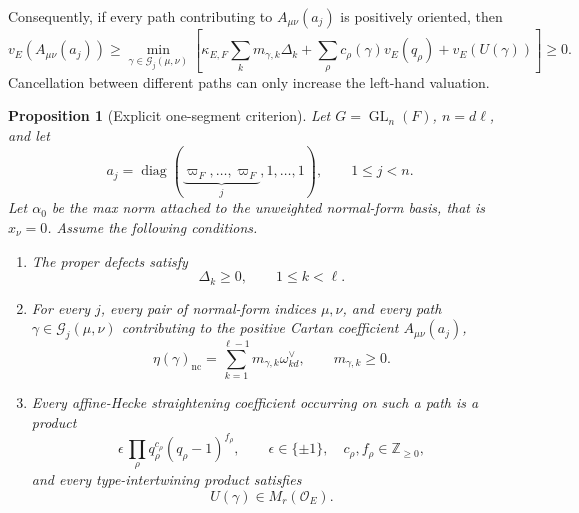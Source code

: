 \documentclass[12pt]{article}
\newtheorem{proposition}[theorem]{Proposition}
\theoremstyle{definition}
\theoremstyle{remark}
\newcommand{\Ocoeff}{\mathcal O_E}
\DeclareMathOperator{\GL}{GL}
\begin{document}
Consequently, if every path contributing to \(A_{\mu\nu}(a_j)\) is
positively oriented, then
\begin{equation}\label{eq:one-segment-A-lower-bound}
 v_E(A_{\mu\nu}(a_j))
 \geq
 \min_{\gamma\in\mathcal G_j(\mu,\nu)}
 \left[
 \kappa_{E,F}
 \sum_km_{\gamma,k}\Delta_k
 +
 \sum_\rho c_\rho(\gamma)v_E(q_\rho)
 +
 v_E(U(\gamma))
 \right]
 \geq0.
\end{equation}
Cancellation between different paths can only increase the left-hand
valuation.

\begin{proposition}[Explicit one-segment criterion]
\label{prop:one-segment}
Let \(G=\GL_n(F)\), \(n=d\ell\), and let
\[
 a_j=\operatorname{diag}(
 \underbrace{\varpi_F,\ldots,\varpi_F}_{j},
 1,\ldots,1),
 \qquad 1\leq j<n.
\]
Let \(\alpha_0\) be the max norm attached to the unweighted normal-form basis,
that is \(x_\nu=0\).  Assume the following conditions.

\begin{enumerate}
 \item[\textup{(H1)}] The proper defects satisfy
 \begin{equation}\label{eq:one-segment-criterion-Hu}
  \Delta_k\geq0,
  \qquad 1\leq k<\ell.
 \end{equation}

 \item[\textup{(H2)}] For every \(j\), every pair of normal-form indices
 \(\mu,\nu\), and every path
 \(\gamma\in\mathcal G_j(\mu,\nu)\) contributing to the positive Cartan
 coefficient \(A_{\mu\nu}(a_j)\),
 \begin{equation}\label{eq:one-segment-criterion-positive-cone}
  \eta(\gamma)_{\mathrm{nc}}
  =
  \sum_{k=1}^{\ell-1}
  m_{\gamma,k}\omega_{kd}^\vee,
  \qquad
  m_{\gamma,k}\geq0.
 \end{equation}

 \item[\textup{(H3)}] Every affine-Hecke straightening coefficient occurring
 on such a path is a product
 \begin{equation}\label{eq:one-segment-criterion-Hecke-integral}
  \epsilon\,
  \prod_\rho q_\rho^{c_\rho}
  (q_\rho-1)^{f_\rho},
  \qquad
  \epsilon\in\{\pm1\},
  \quad
  c_\rho,f_\rho\in\mathbb Z_{\geq0},
 \end{equation}
 and every type-intertwining product satisfies
 \begin{equation}\label{eq:one-segment-criterion-type-integral}
  U(\gamma)\in M_r(\Ocoeff).
 \end{equation}


\end{enumerate}
\end{proposition}
\end{document}
